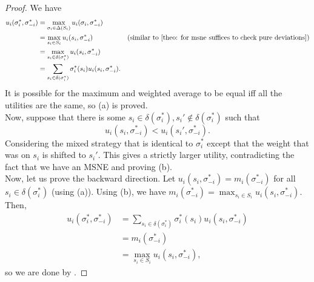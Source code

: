 	\begin{proof}
		We have
		\begin{align*}
			u_i(\sigma_i^*,\sigma_{-i}^*) &= \max_{\sigma_i \in \Delta(S_i)} u_i(\sigma_i,\sigma_{-i}^*) \\
				&= \max_{s_i \in S_i} u_i(s_i,\sigma_{-i}^*) & \text{(similar to \Cref{theo: for msne suffices to check pure deviations})} \\
				&= \max_{s_i \in \delta(\sigma_i^*)} u_i(s_i,\sigma_{-i}^*) \\
				&= \sum_{s_i \in \delta(\sigma_i^*)} \sigma_i^*(s_i) u_i(s_i,\sigma_{-i}^*).
		\end{align*}
		It is possible for the maximum and weighted average to be equal iff all the utilities are the same, so (a) is proved.\\
		Now, suppose that there is some $s_i \in \delta(\sigma_i^*), s_i' \not\in \delta(\sigma_i^*)$ such that
		\[ u_i(s_i,\sigma_{-i}^*) < u_i(s_i',\sigma_{-i}^*). \]
		Considering the mixed strategy that is identical to $\sigma_i^*$ except that the weight that was on $s_i$ is shifted to $s_i'$. This gives a strictly larger utility, contradicting the fact that we have an MSNE and proving (b).\\

		Now, let us prove the backward direction. Let $u_i(s_i,\sigma_{-i}^*) = m_i(\sigma_{-i}^*)$ for all $s_i \in \delta(\sigma_i^*)$ (using (a)). Using (b), we have $m_i(\sigma_{-i}^*) = \max_{s_i \in S_i} u_i(s_i,\sigma_{-i}^*)$. Then,
		\begin{align*}
			u_i(\sigma_i^*,\sigma_{-i}^*) &= \sum_{s_i \in \delta(\sigma_i^*)} \sigma_i^*(s_i) u_i(s_i,\sigma_{-i}^*) \\
				&= m_i(\sigma_{-i}^*) \\
				&= \max_{s_i \in S_i} u_i(s_i,\sigma_{-i}^*),
		\end{align*}
		so we are done by .
	\end{proof}

